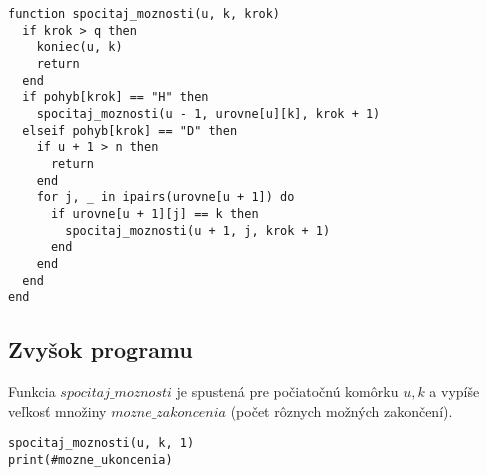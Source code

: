 \documentclass{article}
\begin{document}
\begin{lstlisting}
function spocitaj_moznosti(u, k, krok)
  if krok > q then
    koniec(u, k)
    return
  end
  if pohyb[krok] == "H" then
    spocitaj_moznosti(u - 1, urovne[u][k], krok + 1)
  elseif pohyb[krok] == "D" then
    if u + 1 > n then
      return
    end
    for j, _ in ipairs(urovne[u + 1]) do
      if urovne[u + 1][j] == k then
        spocitaj_moznosti(u + 1, j, krok + 1)
      end
    end
  end
end

\end{lstlisting}

\subsection{Zvyšok programu}

Funkcia \(spocitaj\_moznosti\) je spustená pre počiatočnú komôrku \(u, k\) a vypíše veľkosť množiny \(mozne\_zakoncenia\) (počet rôznych možných zakončení).

\begin{lstlisting}[language={[5.0]Lua}]
spocitaj_moznosti(u, k, 1)
print(#mozne_ukoncenia)
\end{lstlisting}
\end{document}
